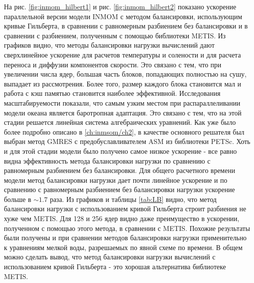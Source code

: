 	На рис. \ref{fig:inmom_hilbert1} и рис. \ref{fig:inmom_hilbert2} показано ускорение параллельной версии модели INMOM с методом балансировки, использующим кривые Гильберта,
    в сравнении с равномерным разбиением без балансировки и в сравнении с разбиением,
    полученным с помощью библиотеки METIS.      
    Из графиков видно, что методы балансировки нагрузки вычислений дают 
    сверхлинейное ускорение для расчетов температуры и солености %
    и для
    расчета переноса и диффузии компонентов скорости. %
    Это связано с тем, что при увеличении числа ядер, 
    большая часть блоков, попадающих полностью на сушу, выпадает из рассмотрения. %
    Более того, размер каждого блока становится мал и работа с кэш памятью становится наиболее эффективной.
    Исследования масштабируемости показали, что самым узким местом при распараллеливании модели океана является баротропная адаптация. %
    Это связано с тем, что
    на этой стадии решается линейная система алгебраических уравнений.
    Как уже было более подробно описано в \ref{ch:inmsom/ch2}, в качестве основного
    решателя был выбран
    метод GMRES с предобуславливателем ASM из библиотеки PETSc.
    Хоть и для этой стадии модели было получено самое низкое ускорение - 
    все равно видна эффективность метода балансировки нагрузки по сравнению с равномерным
    разбиением без балансировки.
    Для общего расчетного времени модели метод балансировки нагрузки дает почти линейное ускорение и по сравнению с равномерным разбиением без балансировки нагрузки ускорение больше в $\sim 1.7$ раза.
	Из графиков и таблицы \ref{tab:LB} видно, что метод балансировки нагрузки с использованием кривой Гильберта строит разбиения не хуже чем METIS.
	Для 128 и 256 ядер видно даже преимущество в ускорении, полученном с помощью
	этого метода, в сравнении с METIS.
	Похожие результаты были получены и при сравнении методов балансировки нагрузки
	применительно к уравнениям мелкой воды, разрешаемых по явной схеме по времени. %
    В общем можно сделать вывод, что метод балансировки нагрузки вычислений с 
    использованием кривой Гильберта - это хорошая альтернатива библиотеке METIS.
    
